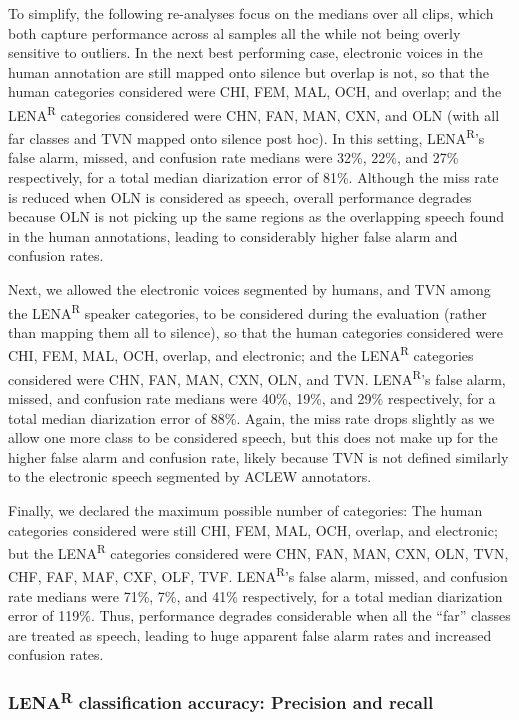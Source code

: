 \documentclass[english,table,man,floatsintext]{apa6}
\begin{document}
To simplify, the following re-analyses focus on the medians over all clips, which both capture performance across al samples all the while not being overly sensitive to outliers. In the next best performing case, electronic voices in the human annotation are still mapped onto silence but overlap is not, so that the human categories considered were CHI, FEM, MAL, OCH, and overlap; and the LENA\textsuperscript{R} categories considered were CHN, FAN, MAN, CXN, and OLN (with all far classes and TVN mapped onto silence post hoc). In this setting, LENA\textsuperscript{R}'s false alarm, missed, and confusion rate medians were 32\%, 22\%, and 27\% respectively, for a total median diarization error of 81\%. Although the miss rate is reduced when OLN is considered as speech, overall performance degrades because OLN is not picking up the same regions as the overlapping speech found in the human annotations, leading to considerably higher false alarm and confusion rates.

Next, we allowed the electronic voices segmented by humans, and TVN among the LENA\textsuperscript{R} speaker categories, to be considered during the evaluation (rather than mapping them all to silence), so that the human categories considered were CHI, FEM, MAL, OCH, overlap, and electronic; and the LENA\textsuperscript{R} categories considered were CHN, FAN, MAN, CXN, OLN, and TVN. LENA\textsuperscript{R}'s false alarm, missed, and confusion rate medians were 40\%, 19\%, and 29\% respectively, for a total median diarization error of 88\%. Again, the miss rate drops slightly as we allow one more class to be considered speech, but this does not make up for the higher false alarm and confusion rate, likely because TVN is not defined similarly to the electronic speech segmented by ACLEW annotators.

Finally, we declared the maximum possible number of categories: The human categories considered were still CHI, FEM, MAL, OCH, overlap, and electronic; but the LENA\textsuperscript{R} categories considered were CHN, FAN, MAN, CXN, OLN, TVN, CHF, FAF, MAF, CXF, OLF, TVF. LENA\textsuperscript{R}'s false alarm, missed, and confusion rate medians were 71\%, 7\%, and 41\% respectively, for a total median diarization error of 119\%. Thus, performance degrades considerable when all the \enquote{far} classes are treated as speech, leading to huge apparent false alarm rates and increased confusion rates.

\hypertarget{lenar-classification-accuracy-precision-and-recall}{%
\subsubsection{\texorpdfstring{LENA\textsuperscript{R} classification accuracy: Precision and recall}{LENAR classification accuracy: Precision and recall}}\label{lenar-classification-accuracy-precision-and-recall}}
\end{document}
